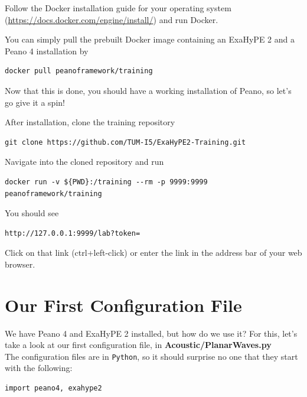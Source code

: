 \documentclass[12pt,letterpaper]{article}
\begin{document}
Follow the Docker installation guide for your operating system (\url{https://docs.docker.com/engine/install/}) and run Docker.

You can simply pull the prebuilt Docker image containing an ExaHyPE 2 and a Peano 4 installation by

\begin{lstlisting}[style = Bash]
docker pull peanoframework/training
\end{lstlisting}

Now that this is done, you should have a working installation of Peano, so let's go give it a spin!

After installation, clone the training repository

\begin{lstlisting}[style = Bash]
git clone https://github.com/TUM-I5/ExaHyPE2-Training.git
\end{lstlisting}

Navigate into the cloned repository and run

\begin{lstlisting}[style = Bash]
docker run -v ${PWD}:/training --rm -p 9999:9999 peanoframework/training
\end{lstlisting}

You should see

\begin{lstlisting}[style = Bash]
http://127.0.0.1:9999/lab?token=
\end{lstlisting}

Click on that link (ctrl+left-click) or enter the link in the address bar of your web browser.

\newpage

\section{Our First Configuration File}
\label{section_3}

We have Peano 4 and ExaHyPE 2 installed, but how do we use it? For this, let's take a look at our first configuration file, in \textbf{Acoustic/PlanarWaves.py}\\
The configuration files are in \texttt{Python}, so it should surprise no one that they start with the following:\\

\begin{lstlisting}[style = Python]
import peano4, exahype2
\end{lstlisting}
\end{document}
